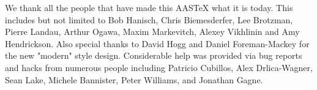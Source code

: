 \documentclass{aastex63}
\begin{document}
\acknowledgments

We thank all the people that have made this AASTeX what it is today.  This
includes but not limited to Bob Hanisch, Chris Biemesderfer, Lee Brotzman,
Pierre Landau, Arthur Ogawa, Maxim Markevitch, Alexey Vikhlinin and Amy
Hendrickson. Also special thanks to David Hogg and Daniel Foreman-Mackey
for the new "modern" style design. Considerable help was provided via bug
reports and hacks from numerous people including Patricio Cubillos, Alex
Drlica-Wagner, Sean Lake, Michele Bannister, Peter Williams, and Jonathan
Gagne.

%

\vspace{5mm}




\end{document}
